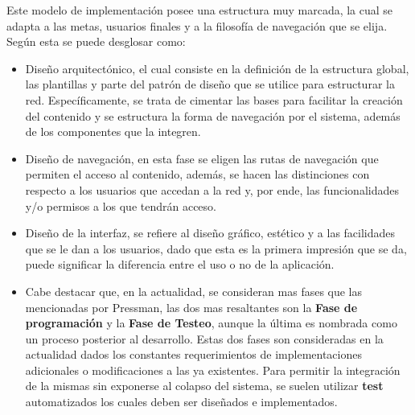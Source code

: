 Este modelo de implementación posee una estructura muy marcada, la cual se adapta
a las metas, usuarios finales y a la filosofía de navegación que se elija.
Según \cite{pressman2002} esta se puede desglosar como:

\begin{itemize}
    \item Diseño arquitectónico, el cual consiste en la definición de la
        estructura global, las plantillas y parte del patrón de diseño que se
        utilice para estructurar la red. Específicamente, se trata de cimentar
        las bases para facilitar la creación del contenido y se estructura la
        forma de navegación por el sistema, además de los componentes que la
        integren.

    \item Diseño de navegación, en esta fase se eligen las rutas de navegación
        que permiten el acceso al contenido, además, se hacen las distinciones
        con respecto a los  usuarios que accedan a la red y,
        por ende, las funcionalidades y/o permisos a los que tendrán acceso.

    \item Diseño de la interfaz, se refiere al diseño gráfico, estético y a
        las facilidades que se le dan a los usuarios, dado que esta es la primera
        impresión que se da, puede significar la diferencia entre el uso o no de
        la aplicación.

    \item Cabe destacar que, en la actualidad, se consideran mas fases que las
        mencionadas por Pressman, las dos mas resaltantes son la
        \textbf{Fase de programación} y la \textbf{Fase de Testeo}, aunque la
        última es nombrada como un proceso posterior al desarrollo. Estas dos
        fases son consideradas en la actualidad dados los constantes requerimientos
        de implementaciones adicionales o modificaciones a las ya existentes.
        Para permitir la integración de la mismas sin exponerse al colapso del
        sistema, se suelen utilizar \textbf{test} automatizados los cuales deben
        ser diseñados e implementados.

\end{itemize}
